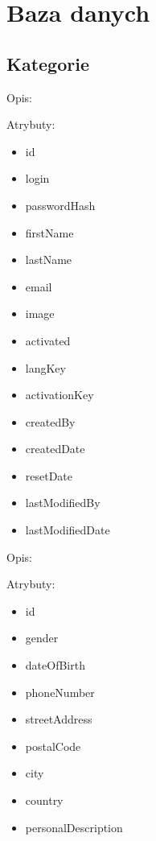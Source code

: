 \section{Baza danych}

\subsection{Kategorie}

\begin{enumerate}[label={\textbf{KAT/\protect\threedigits{\theenumi}}}, wide, labelwidth=!, labelindent=0pt, series=reqs]
    \setlength\itemsep{1em}
     \label{kat:user}

    Opis: \lipsum[1]
    \par
    Atrybuty:
    \begin{itemize}
        \item id
        \item login
        \item passwordHash
        \item firstName
        \item lastName
        \item email
        \item image
        \item activated
        \item langKey
        \item activationKey
        \item createdBy
        \item createdDate
        \item resetDate
        \item lastModifiedBy
        \item lastModifiedDate
    \end{itemize}

     \label{kat:UserExtraInfo}

    Opis: \lipsum[1]
    \par
    Atrybuty:
    \begin{itemize}
        \item id
        \item gender
        \item dateOfBirth
        \item phoneNumber
        \item streetAddress
        \item postalCode
        \item city
        \item country
        \item personalDescription
    \end{itemize}


\end{enumerate}
